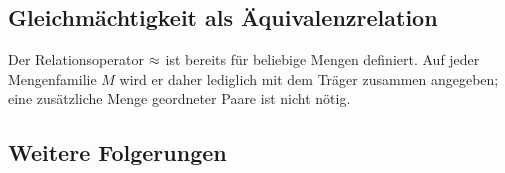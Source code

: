 \documentclass[main.tex]{subfiles}
\begin{document}
\subsection{Gleichmächtigkeit als Äquivalenzrelation}

Der Relationsoperator \(\mathrel{\approx}\) ist bereits für beliebige Mengen definiert.
Auf jeder Mengenfamilie \(M\) wird er daher lediglich mit dem Träger
zusammen angegeben; eine zusätzliche Menge geordneter Paare ist nicht nötig.

\begin{tabproof}
\end{tabproof}

\subsection{Weitere Folgerungen}
\end{document}
